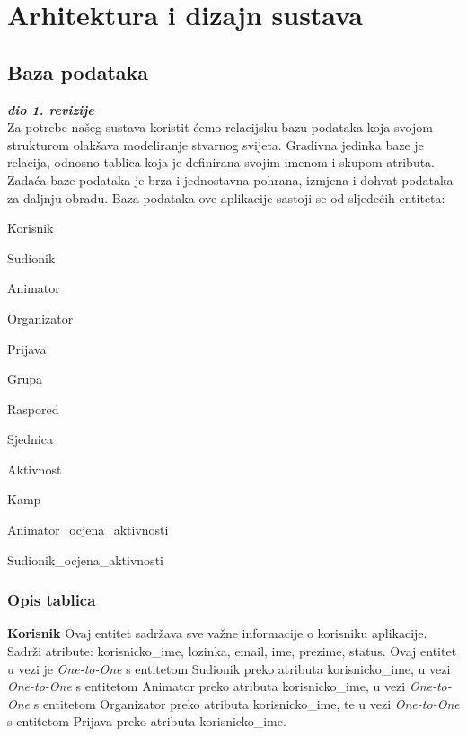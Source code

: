 \chapter{Arhitektura i dizajn sustava}
	
		\section{Baza podataka}
			
			\textbf{\textit{dio 1. revizije}}\\
			
		Za potrebe našeg sustava koristit ćemo relacijsku bazu podataka koja svojom strukturom olakšava modeliranje stvarnog svijeta. Gradivna jedinka baze je relacija, odnosno tablica koja je definirana svojim imenom i skupom atributa. Zadaća baze podataka je brza i jednostavna pohrana, izmjena i dohvat podataka za daljnju obradu. Baza podataka ove aplikacije sastoji se od sljedećih entiteta:
		\begin{packed_item}
			\item Korisnik
			\item Sudionik
			\item Animator
			\item Organizator
			\item Prijava
			\item Grupa
			\item Raspored
			\item Sjednica
			\item Aktivnost
			\item Kamp
			\item Animator\_ocjena\_aktivnosti
			\item Sudionik\_ocjena\_aktivnosti
		\end{packed_item}
			\subsection{Opis tablica}
			

				\textbf{Korisnik}	Ovaj entitet sadržava sve važne informacije o korisniku aplikacije. Sadrži atribute: korisnicko\_ime, lozinka, email, ime, prezime, status. Ovaj entitet u vezi je \textit{One-to-One} s entitetom Sudionik preko atributa korisnicko\_ime, u vezi \textit{One-to-One} s entitetom Animator preko atributa korisnicko\_ime, u vezi \textit{One-to-One} s entitetom Organizator preko atributa korisnicko\_ime, te u vezi \textit{One-to-One} s entitetom Prijava preko atributa korisnicko\_ime.
				
